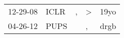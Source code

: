 \begin{supertabular}{p{0.07\textwidth}p{0.06\textwidth}p{0.02\textwidth}p{0.02\textwidth}p{0.06\textwidth}}
 12-29-08\textsuperscript{} &  ICLR\textsuperscript{} &  , &  \textgreater &  19yo\textsuperscript{} \\
 04-26-12\textsuperscript{} &  PUPS\textsuperscript{} &    &             , &  drgb\textsuperscript{} \\
\end{supertabular}
